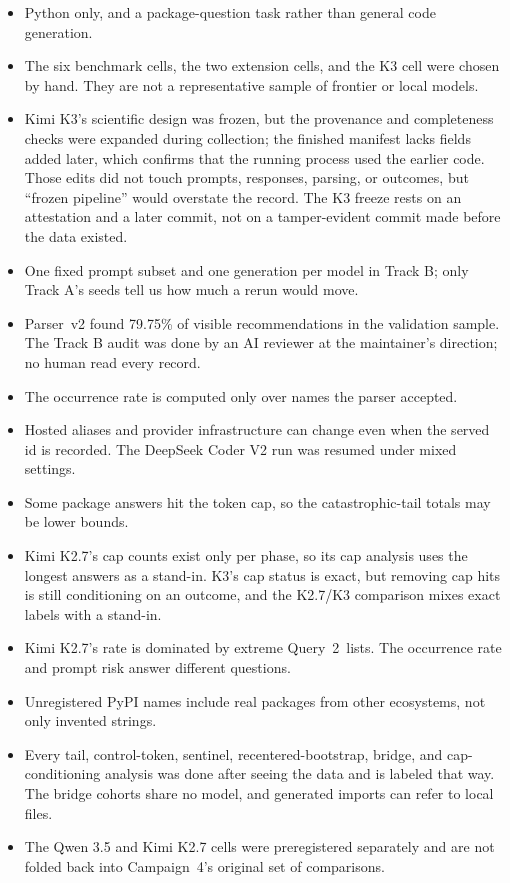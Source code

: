 \documentclass[10pt,twocolumn,letterpaper]{article}
\newcommand{\qtwo}{Query~2}
\begin{document}
\begin{itemize}
\item Python only, and a package-question task rather than general code generation.
\item The six benchmark cells, the two extension cells, and the K3 cell were chosen by hand. They are
  not a representative sample of frontier or local models.
\item Kimi K3's scientific design was frozen, but the provenance and completeness checks were
  expanded during collection; the finished manifest lacks fields added later, which confirms that the
  running process used the earlier code. Those edits did not touch prompts, responses, parsing, or
  outcomes, but ``frozen pipeline'' would overstate the record. The K3 freeze rests on an attestation
  and a later commit, not on a tamper-evident commit made before the data existed.
\item One fixed prompt subset and one generation per model in Track B; only Track A's seeds tell us
  how much a rerun would move.
\item Parser~v2 found 79.75\% of visible recommendations in the validation sample. The Track B audit
  was done by an AI reviewer at the maintainer's direction; no human read every record.
\item The occurrence rate is computed only over names the parser accepted.
\item Hosted aliases and provider infrastructure can change even when the served id is recorded. The
  DeepSeek Coder V2 run was resumed under mixed settings.
\item Some package answers hit the token cap, so the catastrophic-tail totals may be lower bounds.
\item Kimi K2.7's cap counts exist only per phase, so its cap analysis uses the longest answers as a
  stand-in. K3's cap status is exact, but removing cap hits is still conditioning on an outcome, and
  the K2.7/K3 comparison mixes exact labels with a stand-in.
\item Kimi K2.7's rate is dominated by extreme \qtwo\ lists. The occurrence rate and prompt risk
  answer different questions.
\item Unregistered PyPI names include real packages from other ecosystems, not only invented strings.
\item Every tail, control-token, sentinel, recentered-bootstrap, bridge, and cap-conditioning analysis
  was done after seeing the data and is labeled that way. The bridge cohorts share no model, and
  generated imports can refer to local files.
\item The Qwen 3.5 and Kimi K2.7 cells were preregistered separately and are not folded back into
  Campaign~4's original set of comparisons.
\end{itemize}
\end{document}
